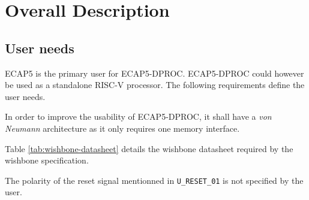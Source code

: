 \section{Overall Description}

  \subsection{User needs}

    \label{user-needs}

    \begin{content}
        ECAP5 is the primary user for ECAP5-DPROC. ECAP5-DPROC could however be used as a standalone RISC-V processor. The following requirements define the user needs. 
      \end{content}


    \begin{content}
        In order to improve the usability of ECAP5-DPROC, it shall have a \textit{von Neumann} architecture as it only requires one memory interface.
      \end{content}




    \begin{content}
        Table \ref{tab:wishbone-datasheet} details the wishbone datasheet required by the wishbone specification.
      \end{content}

    

    \vspace{0.5em}


    \begin{content}
        The polarity of the reset signal mentionned in \texttt{U\_RESET\_01} is not specified by the user.
      \end{content}


